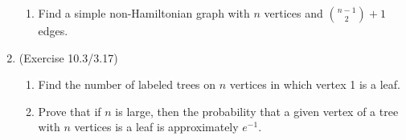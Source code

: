 \documentclass{article}
\begin{document}
\begin{enumerate}
\begin{enumerate}
	\item Find a simple non-Hamiltonian graph with $n$ vertices and $\displaystyle\binom{n-1} 2 + 1$ edges.
\end{enumerate}

\item (Exercise 10.3/3.17)
\begin{enumerate}
	\item Find the number of labeled trees on $n$ vertices in which vertex 1 is a leaf.

	\item Prove that if $n$ is large, then the probability that a given vertex of a tree with $n$ vertices is a leaf is approximately $e^{-1}$.
\end{enumerate}


\end{enumerate}
\end{document}
